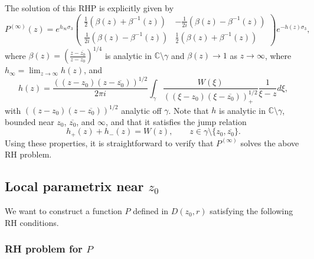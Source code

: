 \documentclass[11pt,fleqn]{article}
\numberwithin{equation}{section}
\begin{document}
The solution of this RHP is explicitly given by
\begin{equation}
P^{(\infty)}(z)= e^{h_\infty\sigma_3}\begin{pmatrix}
\frac{1}{2} \left( \beta(z) + \beta^{-1}(z) \right) & -\frac{1}{2i} \left( \beta(z) - \beta^{-1}(z) \right) \\
\frac{1}{2i} \left( \beta(z) - \beta^{-1}(z) \right) & \frac{1}{2} \left( \beta(z) + \beta^{-1}(z) \right)
\end{pmatrix}e^{-h(z)\sigma_3} ,
\end{equation}
where $\beta(z) = \left(\frac{z-\overline{z_{0}}}{z-z_{0}}\right)^{1/4}$ is analytic in $\mathbb{C}\setminus \gamma$ and $\beta(z) \to 1$ as $z\to\infty$, 
where $h_\infty=\lim_{z\to\infty}h(z)$, and
\begin{equation}\label{h}
h(z)=\frac{\left((z-z_0)(z-\overline{z_0})\right)^{1/2}}{2\pi i}\int_{\gamma}\frac{W(\xi)}{\left((\xi-z_0)(\xi-\overline{z_0})\right)_+^{1/2}}\frac{1}{\xi-z}d\xi,
\end{equation}
with $\left((z-z_0)(z-\overline{z_0})\right)^{1/2}$ analytic off $\gamma$. Note that $h$ is analytic in $\mathbb C\setminus \gamma$, bounded near $z_0$, $\overline{z_0}$, and $\infty$, and that it satisfies the jump relation 
\[h_+(z)+h_-(z)=W(z),\qquad z\in\gamma\setminus \{z_{0},\overline{z_{0}}\}.\] Using these properties, it is straightforward to verify that $P^{(\infty)}$ solves the above RH problem.


\subsection{Local parametrix near $z_{0}$}\label{section: Bessel}
We want to construct a function $P$ defined in $D(z_0,r)$ satisfying the following RH conditions.
\subsubsection*{RH problem for $P$}
\end{document}
